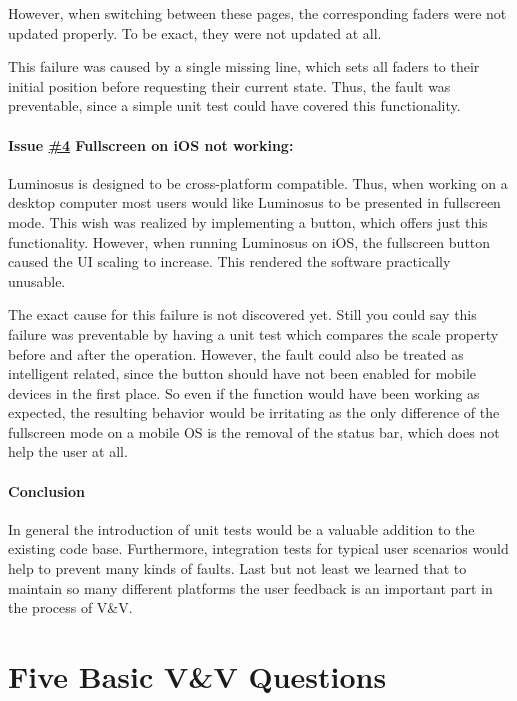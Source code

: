 \documentclass{scrreprt}
\begin{document}
However, when switching between these pages, the corresponding faders were not updated properly. To be exact, they were not updated at all.

This failure was caused by a single missing line, which sets all faders to their initial position before requesting their current state. Thus, the fault was preventable, since a simple unit test could have covered this functionality.


\paragraph{Issue \href{https://github.com/ETCLabs/LuminosusEosEdition/issues/4}{\#4} Fullscreen on iOS not working:}

Luminosus is designed to be cross-platform compatible. Thus, when working on a desktop computer most users would like Luminosus to be presented in fullscreen mode. This wish was realized by implementing a button, which offers just this functionality.
However, when running Luminosus on iOS, the fullscreen button caused the UI scaling to increase. This rendered the software practically unusable.

The exact cause for this failure is not discovered yet. Still you could say this failure was preventable by having a unit test which compares the scale property before and after the operation. However, the fault could also be treated as intelligent related, since the button should have not been enabled for mobile devices in the first place. So even if the function would have been working as expected, the resulting behavior would be irritating as the only difference of the fullscreen mode on a mobile OS is the removal of the status bar, which does not help the user at all.

\paragraph{Conclusion}
In general the introduction of unit tests would be a valuable addition to the existing code base. Furthermore, integration tests for typical user scenarios would help to prevent many kinds of faults. Last but not least we learned that to maintain so many different platforms the user feedback is an important part in the process of V\&V.


\section{Five Basic V\&V Questions}
\end{document}
